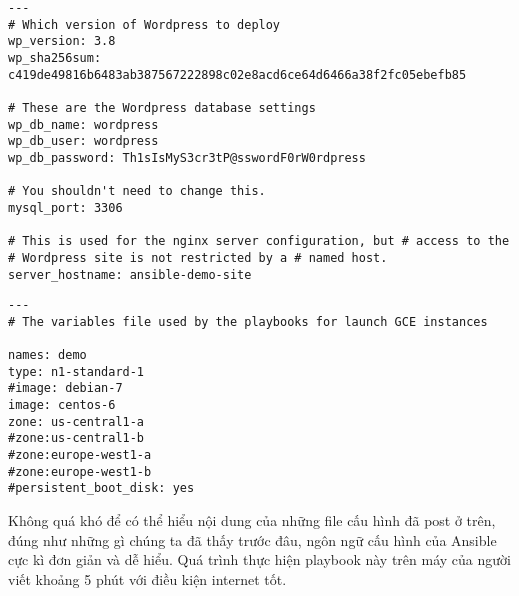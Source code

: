 \begin{lstlisting}[label={lst:labs_gce-wordpress-nginx_group_vars_all},caption={Nội dung của group\_vars/all},morekeywords={wp_version, wp_sha256sum, wp_db_name, wp_db_user, wp_db_password, mysql_port, server_hostname}]
---
# Which version of Wordpress to deploy
wp_version: 3.8
wp_sha256sum: c419de49816b6483ab387567222898c02e8acd6ce64d6466a38f2fc05ebefb85

# These are the Wordpress database settings
wp_db_name: wordpress
wp_db_user: wordpress
wp_db_password: Th1sIsMyS3cr3tP@sswordF0rW0rdpress

# You shouldn't need to change this.
mysql_port: 3306

# This is used for the nginx server configuration, but # access to the
# Wordpress site is not restricted by a # named host.
server_hostname: ansible-demo-site

\end{lstlisting}

\begin{lstlisting}[label={lst:labs_gce-wordpress-nginx_group_vars_gce},caption={Nội dung của group\_vars/gce},morekeywords={names, type, image, zone}]
---
# The variables file used by the playbooks for launch GCE instances

names: demo
type: n1-standard-1
#image: debian-7
image: centos-6
zone: us-central1-a
#zone:us-central1-b
#zone:europe-west1-a
#zone:europe-west1-b
#persistent_boot_disk: yes

\end{lstlisting}

Không quá khó để có thể hiểu nội dung của những file cấu hình đã post ở trên, đúng như những gì chúng ta đã thấy trước đâu, ngôn ngữ cấu hình của Ansible cực kì đơn giản và dễ hiểu. Quá trình thực hiện playbook này trên máy của người viết khoảng 5 phút với điều kiện internet tốt.
